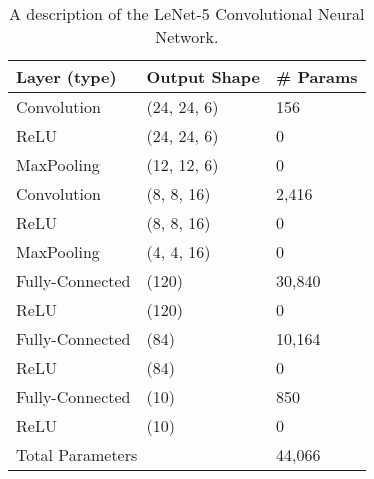 \begin{table}
	\begin{tabularx}{\columnwidth}{|X|X|X|} \hline
		Layer (type) & Output Shape & \# Params \\ \hline\hline
		Convolution  & (24, 24, 6) & 156 \\
		ReLU & (24, 24, 6) & 0 \\
		MaxPooling & (12, 12, 6) & 0 \\
		Convolution & (8, 8, 16) & 2,416 \\
		ReLU & (8, 8, 16) & 0 \\
		MaxPooling & (4, 4, 16) & 0 \\
		Fully-Connected & (120) & 30,840 \\
		ReLU & (120) & 0 \\
		Fully-Connected & (84) & 10,164 \\
		ReLU & (84) & 0 \\
		Fully-Connected & (10) & 850 \\
		ReLU & (10) & 0 \\ \hline
		\multicolumn{2}{|l|}{Total Parameters} & 44,066 \\\hline
	\end{tabularx}
\caption{A description of the LeNet-5 Convolutional Neural Network.}
\end{table}

